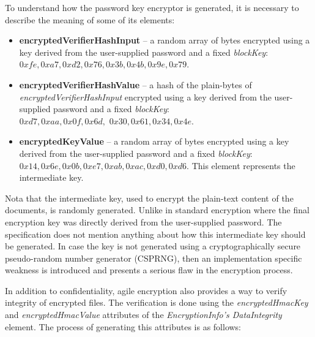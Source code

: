 \documentclass[11pt,oneside]{fithesis2}
\begin{document}
To understand how the password key encryptor is generated, it is necessary to describe the meaning of some of its elements:

\begin{itemize}
\setlength\itemsep{0.1em}
	\item{\textbf{encryptedVerifierHashInput} -- a random array of bytes encrypted using a key derived from the user-supplied password and a fixed \textit{blockKey}: $0xfe, 0xa7, 0xd2, 0x76, 0x3b, 0x4b, 0x9e, 0x79$.} 
	\item{\textbf{encryptedVerifierHashValue} -- a hash of the plain-bytes of \textit{encryptedVerifierHashInput} encrypted using a key derived from the user-supplied password and a fixed \textit{blockKey}:\\ $0xd7, 0xaa, 0x0f, 0x6d,$ $0x30, 0x61, 0x34, 0x4e$.}
	\item{\textbf{encryptedKeyValue} -- a random array of bytes encrypted using a key derived from the user-supplied password and a fixed \textit{blockKey}: $0x14, 0x6e, 0x0b, 0xe7, 0xab, 0xac, 0xd0, 0xd6$. This element represents the intermediate key.}
\end{itemize}

Nota that the intermediate key, used to encrypt the plain-text content of the documents, is randomly generated. Unlike in standard encryption where the final encryption key was directly derived from the user-supplied password. The specification does not mention anything about how this intermediate key should be generated. In case the key is not generated using a cryptographically secure pseudo-random number generator (CSPRNG), then an implementation specific weakness is introduced and presents a serious flaw in the encryption process. 

In addition to confidentiality, agile encryption also provides a way to verify integrity of encrypted files. The verification is done using the \textit{encryptedHmacKey} and \textit{encryptedHmacValue} attributes of the \textit{EncryptionInfo's DataIntegrity} element. The process of generating this attributes is as follows:
\end{document}
